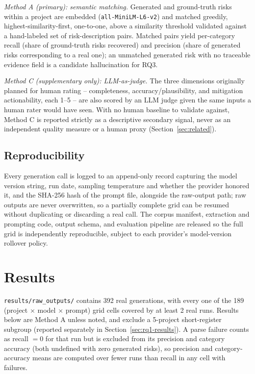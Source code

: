 \documentclass[10pt, conference, letterpaper]{IEEEtran}
\begin{document}
\emph{Method A (primary): semantic matching.} Generated and ground-truth
risks within a project are embedded (\texttt{all-MiniLM-L6-v2}) and matched
greedily, highest-similarity-first, one-to-one, above a similarity
threshold validated against a hand-labeled set of risk-description pairs.
Matched pairs yield per-category recall (share of ground-truth risks
recovered) and precision (share of generated risks corresponding to a real
one); an unmatched generated risk with no traceable evidence field is a
candidate hallucination for RQ3.

\emph{Method C (supplementary only): LLM-as-judge.} The three dimensions
originally planned for human rating -- completeness, accuracy/plausibility,
and mitigation actionability, each 1--5 -- are also scored by an LLM judge
given the same inputs a human rater would have seen. With no human baseline
to validate against, Method C is reported strictly as a descriptive
secondary signal, never as an independent quality measure or a human proxy
(Section~\ref{sec:related}).

\subsection{Reproducibility}
Every generation call is logged to an append-only record capturing the
model version string, run date, sampling temperature and whether the
provider honored it, and the SHA-256 hash of the prompt file, alongside the
raw-output path; raw outputs are never overwritten, so a partially complete
grid can be resumed without duplicating or discarding a real call. The
corpus manifest, extraction and prompting code, output schema, and
evaluation pipeline are released so the full grid is independently
reproducible, subject to each provider's model-version rollover policy.

\section{Results}
\label{sec:results}

\texttt{results/raw\_outputs/} contains 392 real generations, with every
one of the 189 (project $\times$ model $\times$ prompt) grid cells covered
by at least 2 real runs. Results below are Method A unless noted, and
exclude a 5-project short-register subgroup (reported separately in
Section~\ref{sec:rq1-results}). A parse failure counts as recall $=0$ for
that run but is excluded from its precision and category accuracy (both
undefined with zero generated risks), so precision and category-accuracy
means are computed over fewer runs than recall in any cell with failures.
\end{document}
